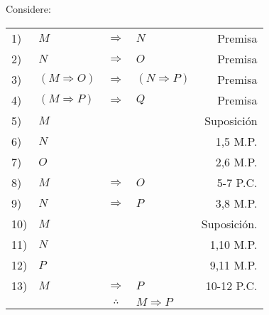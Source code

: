 \documentclass[12pt]{report}
\theoremstyle{largebreak}
\begin{document}
    \begin{exa}
        Considere:

        \begin{center}
            \begin{tabular}{l l c l r}
                1) & $M$ & $\Rightarrow$ & $N$ & Premisa \\
                2) & $N$ & $\Rightarrow$ & $O$ & Premisa \\
                3) & $(M\Rightarrow O)$ & $\Rightarrow$ & $(N\Rightarrow P)$ & Premisa \\
                4) & $(M\Rightarrow P)$ & $\Rightarrow$ & $Q$ & Premisa \\
                5) & $M$ &  &  & Suposición \\
                6) & $N$ &  &  & 1,5 M.P. \\
                7) & $O$ &  &  & 2,6 M.P. \\
                8) & $M$ & $\Rightarrow$ & $O$ & 5-7 P.C. \\
                9) & $N$ & $\Rightarrow$ & $P$ & 3,8 M.P. \\
                10) & $M$ &  &  & Suposición. \\
                11) & $N$ &  &  & 1,10 M.P. \\
                12) & $P$ &  &  & 9,11 M.P. \\
                13) & $M$ & $\Rightarrow$ & $P$ & 10-12 P.C. \\
                \hline
                & & $\therefore$ & $M\Rightarrow P$ & \\
            \end{tabular}
        \end{center}

    \end{exa}
\end{document}
